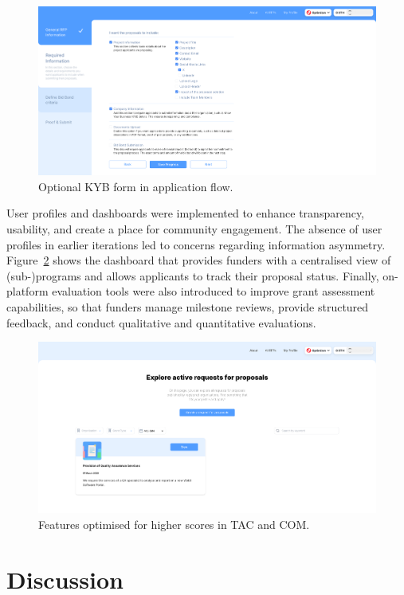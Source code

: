 \documentclass[conference]{IEEEtran}
\begin{document}
\begin{figure}[htbp]
\centerline{\includegraphics[scale=0.1]{KYB-optional-blinded.png}}
\caption{Optional KYB form in application flow.}
\label{fig:kyb-optional}
\end{figure}

User profiles and dashboards were implemented to enhance transparency, usability, and create a place for community engagement. The absence of user profiles in earlier iterations led to concerns regarding information asymmetry. Figure~\ref{fig:all-rfps} shows the dashboard that provides funders with a centralised view of (sub-)programs and allows applicants to track their proposal status. Finally, on-platform evaluation tools were also introduced to improve grant assessment capabilities, so that funders manage milestone reviews, provide structured feedback, and conduct qualitative and quantitative evaluations.

\begin{figure}[htbp]
\centerline{\includegraphics[scale=0.1]{all-rfps-blinded.png}}
\caption{Features optimised for higher scores in TAC and COM.}
\label{fig:all-rfps}
\end{figure}

\section{Discussion}\label{sec_5}
\end{document}
